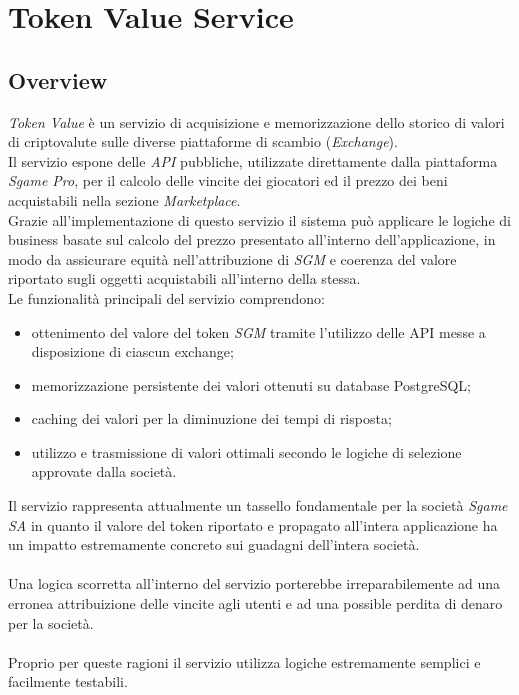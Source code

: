 \documentclass[11pt]{thesistemp}
\begin{document}
\section{Token Value Service}

\subsection{Overview}

\textit{Token Value} è un servizio di acquisizione e memorizzazione dello storico di valori di criptovalute sulle diverse piattaforme di scambio (\textit{Exchange}).\\
Il servizio espone delle \textit{API} pubbliche, utilizzate direttamente dalla piattaforma \textit{Sgame Pro}, per il calcolo delle vincite dei giocatori ed il prezzo dei beni acquistabili nella sezione \textit{Marketplace}. \\
Grazie all'implementazione di questo servizio il sistema può applicare le logiche di business basate sul calcolo del prezzo presentato all'interno dell'applicazione, in modo da assicurare equità nell'attribuzione di \textit{SGM} e coerenza del valore riportato sugli oggetti acquistabili all'interno della stessa.\\
Le funzionalità principali del servizio comprendono:
\begin{itemize}
	\item ottenimento del valore del token \textit{SGM} tramite l'utilizzo delle API messe a disposizione di ciascun exchange;
	\item memorizzazione persistente dei valori ottenuti su database PostgreSQL;
	\item caching dei valori per la diminuzione dei tempi di risposta;
	\item utilizzo e trasmissione di valori ottimali secondo le logiche di selezione approvate dalla società.
\end{itemize}
Il servizio rappresenta attualmente un tassello fondamentale per la società \textit{Sgame SA} in quanto il valore del token riportato e propagato all'intera applicazione ha un impatto estremamente concreto sui guadagni dell'intera società.\\\\
Una logica scorretta all'interno del servizio porterebbe irreparabilemente ad una erronea attribuizione delle vincite agli utenti e ad una possible perdita di denaro per la società.\\\\
Proprio per queste ragioni il servizio utilizza logiche estremamente semplici e facilmente testabili.
\pagebreak
\end{document}
